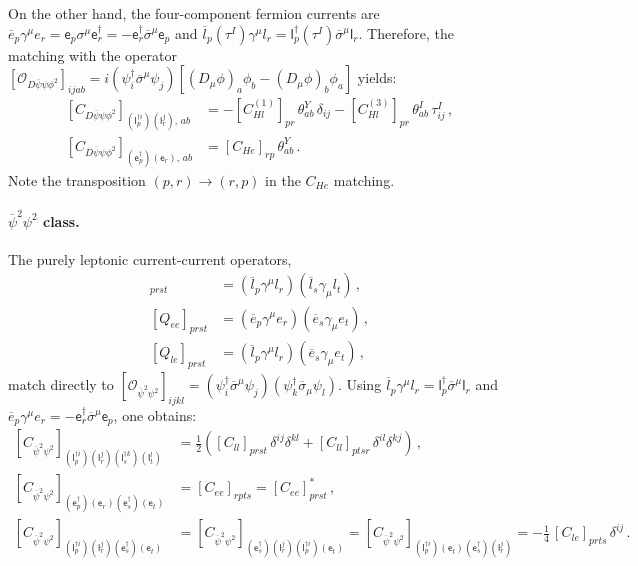 On the other hand, the four-component fermion currents are $\overline e_p \gamma^\mu e_r = \mathsf{e}_p\sigma^\mu\mathsf{e}_r^\dagger = -\mathsf{e}_r^\dagger\overline\sigma^\mu\mathsf{e}_p$ and $\overline l_p (\tau^I) \gamma^\mu l_r = \mathsf l^\dagger_p (\tau^I) \overline \sigma^\mu \mathsf l_r$. Therefore, the matching with the operator $[\mathcal O_{D\overline \psi \psi \phi^2}]_{ijab} = i (\psi_i^\dagger \overline \sigma^\mu \psi_j)[(D_\mu \phi)_a \phi_b - (D_\mu \phi)_b \phi_a]$ yields:
\begin{align}
    \left[C_{D\overline\psi\psi\phi^2}\right]_{(\mathsf{l}^{\dagger i}_p)(\mathsf{l}^j_r),\,ab} &= -[C_{Hl}^{(1)}]_{pr}\,\theta^Y_{ab}\,\delta_{ij} - [C_{Hl}^{(3)}]_{pr}\,\theta^I_{ab}\,\tau^I_{ij}\,,\label{eq:CHl_matching}\\
    \left[C_{D\overline\psi\psi\phi^2}\right]_{(\mathsf{e}^\dagger_p)(\mathsf{e}_r),\,ab} & =[C_{He}]_{rp}\,\theta^Y_{ab} \,.\label{eq:CHe_matching}
\end{align}
Note the transposition $(p,r)\to(r,p)$ in the $C_{He}$ matching.

\paragraph{$\overline\psi^2\psi^2$ class.}
The purely leptonic current-current operators,
\begin{align}
    [Q_{ll}]_{prst} &= \left(\overline l_p \gamma^\mu l_r\right)\left(\overline l_s \gamma_\mu l_t\right)\,,\\
    [Q_{ee}]_{prst} &= \left(\overline e_p \gamma^\mu e_r\right)\left(\overline e_s \gamma_\mu e_t\right)\,,\\
    [Q_{le}]_{prst} &= \left(\overline l_p \gamma^\mu l_r\right)\left(\overline e_s \gamma_\mu e_t\right)\,,
\end{align}
match directly to $[\mathcal O_{\overline \psi^2 \psi^2}]_{ijkl}=(\psi^\dagger_i\overline\sigma^\mu\psi_j)(\psi^\dagger_k\overline\sigma_\mu\psi_l)$. Using $\overline l_p\gamma^\mu l_r = \mathsf{l}_p^\dagger\overline\sigma^\mu\mathsf{l}_r$ and $\overline e_p\gamma^\mu e_r = -\mathsf{e}_r^\dagger\overline\sigma^\mu\mathsf{e}_p$, one obtains:
\begin{align}
    \left[C_{\overline\psi^2\psi^2}\right]_{(\mathsf{l}^{\dagger i}_p)(\mathsf{l}^j_r)(\mathsf{l}^{\dagger k}_s)(\mathsf{l}^l_t)} &= \frac{1}{2} \left([C_{ll}]_{prst}\,\delta^{ij}\delta^{kl} +[C_{ll}]_{ptsr}\, \delta^{il}\delta^{kj}\right)\,,\label{eq:Cll_matching}\\
    \left[C_{\overline\psi^2\psi^2}\right]_{(\mathsf{e}^\dagger_p)(\mathsf{e}_r)(\mathsf{e}^\dagger_s)(\mathsf{e}_t)} &= [C_{ee}]_{rpts} = [C_{ee}]^*_{prst}\,,\label{eq:Cee_matching}\\
    \left[C_{\overline\psi^2\psi^2}\right]_{(\mathsf{l}^{\dagger i}_p)(\mathsf{l}^j_r)(\mathsf{e}^\dagger_s)(\mathsf{e}_t)} &= \left[C_{\overline\psi^2\psi^2}\right]_{(\mathsf{e}^\dagger_s)(\mathsf{l}^j_r)(\mathsf{l}^{\dagger i}_p)(\mathsf{e}_t)} = \left[C_{\overline\psi^2\psi^2}\right]_{(\mathsf{l}^{\dagger i}_p)(\mathsf{e}_t)(\mathsf{e}^\dagger_s)(\mathsf{l}^j_r)} = -\frac{1}{4}\,[C_{l e}]_{prts}\,\delta^{ij}\,.\label{eq:Cle_matching}
\end{align}

